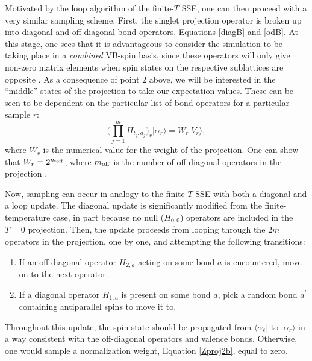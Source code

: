 \documentclass[vecphys]{svmult}
\begin{document}
Motivated by the loop algorithm of the finite-$T$ SSE, one can then proceed with a very similar sampling scheme.  First, the singlet projection operator is broken up into diagonal and off-diagonal bond operators, Equations \ref{diagB} and \ref{odB}.
At this stage, one sees that it is advantageous to consider the simulation to be taking place in a {\em combined} VB-spin basis, since these operators will only give non-zero matrix elements when spin states on the respective sublattices are opposite \cite{Melko:Sandvik10a}.  
As a consequence of point 2 above, we will be interested in the ``middle'' states of the projection to take our expectation values.  
{\color{red}These can be seen to be dependent on the particular list of bond operators for a particular sample $r$: 
\begin{equation}
\big( \prod_{j=1}^{m} {H_{t_j,a_j}} \big)_r | \alpha_r \rangle = W_r |V_r \rangle, \label{midV}
\end{equation}
 where $W_r$ is the numerical value for the weight of the projection.  One can show that $W_r = 2^{m_{\rm off}}$, where $m_{\rm off}$ is the number of off-diagonal operators in the projection \cite{Melko:Sandvik05,Melko:AWSBeach}.}

Now, sampling can occur in analogy to the finite-$T$ SSE with both a diagonal and a loop update.
The diagonal update is significantly modified from the finite-temperature case, in part because no null ($H_{0,0}$) operators are included in the $T=0$ projection.  Then, the update proceeds from looping through the $2m$ operators in the projection, one by one, and attempting the following transitions:
\begin{enumerate}
\item If an off-diagonal operator $H_{2,a}$ acting on some bond $a$ is encountered, move on to the next operator.
\item If a diagonal operator $H_{1,a}$ is present on some bond $a$, pick a random bond $a^\prime$ containing antiparallel spins to move it to.
\end{enumerate}
Throughout this update, the spin state should be propagated from $\langle \alpha_{\ell} |$ to $| \alpha_r \rangle$ in a way consistent with the off-diagonal operators and valence bonds.  Otherwise, one would sample a normalization weight, Equation \ref{Zproj2b}, equal to zero.
\end{document}
